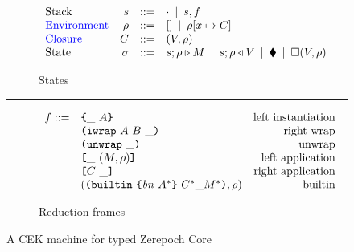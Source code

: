 \documentclass[../zerepoch-core-specification.tex]{subfiles}
\begin{document}
\begin{figure}[!ht]
\begin{subfigure}[c]{\linewidth}        %
\[
\begin{array}{lrcl}
        \textrm{Stack} & s      & ::= & \cdot \enspace | \enspace s,f    \\
        \textcolor{blue}{ \textrm{Environment}} & \rho & ::= & [] \enspace | \enspace \rho[x \mapsto C] \\
        \textcolor{blue}{ \textrm{Closure}} & C  & ::= & (V,\rho) \\
        \textrm{State} & \sigma & ::= & s;\rho \triangleright M \enspace | \enspace s;\rho \triangleleft V  \enspace | \enspace \blacklozenge{} \enspace | \enspace \square (V,\rho)
    \end{array}
\]
\caption{States}
\end{subfigure}

\vspace{1mm}
\hrule
\vspace{2mm}

\begin{subfigure}[c]{\linewidth}  %
\[
    \begin{array}{rlr}
       f ::= & \texttt{\{}\_ ~ A\texttt{\}}                        & \textrm{left instantiation}\\
             & \texttt{(} \texttt{iwrap} ~ A ~ B ~ \_ \texttt{)}                    & \textrm{right wrap}\\
             & \texttt{(} \texttt{unwrap} ~ \_ \texttt{)}{}                           & \textrm{unwrap}\\
             & \texttt{[} \_ ~ (M,\rho) \texttt{]}                  & \textrm{left application}\\
             & \texttt{[} C ~ \_ \texttt{]}                        & \textrm{right application}\\
             & (\texttt{(} \texttt{builtin} ~ \texttt{\{} \mathit{bn} ~ A^* \texttt{\}} ~ C^* \_ M^* \texttt{)}, \rho)   & \textrm{builtin}\\
    \end{array}
\]
\caption{Reduction frames}
\end{subfigure}

\caption{A CEK machine for typed Zerepoch Core}
\end{figure}
\end{document}
